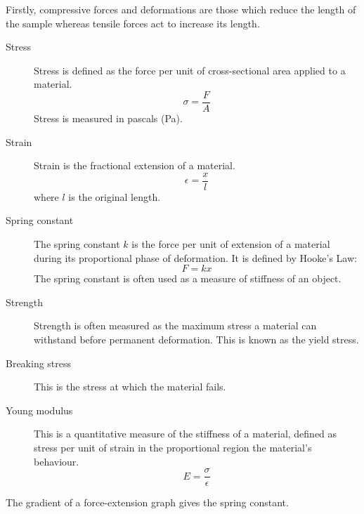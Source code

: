 \documentclass[main.tex]{subfiles}
\begin{document}

Firstly, compressive forces and deformations are those which reduce the length of the sample whereas tensile forces act to increase its length.

\begin{description}
    \item[Stress] Stress is defined as the force per unit of cross-sectional area applied to a material. \[ \sigma = \frac{F}{A} \] Stress is measured in pascals (Pa).
    \item[Strain] Strain is the fractional extension of a material. \[ \epsilon = \frac{x}{l} \]
    where $l$ is the original length.
    \item[Spring constant] The spring constant $k$ is the force per unit of extension of a material during its proportional phase of deformation. It is defined by Hooke's Law: \[ F = kx\] The spring constant is often used as a measure of stiffness of an object.
    \item[Strength] Strength is often measured as the maximum stress a material can withstand before permanent deformation. This is known as the yield stress.
    \item[Breaking stress] This is the stress at which the material fails.
    \item[Young modulus] This is a quantitative measure of the stiffness of a material, defined as stress per unit of strain in the proportional region the material's behaviour. \[ E = \frac{\sigma}{\epsilon} \]
\end{description}


The gradient of a force-extension graph gives the spring constant.
\end{document}
